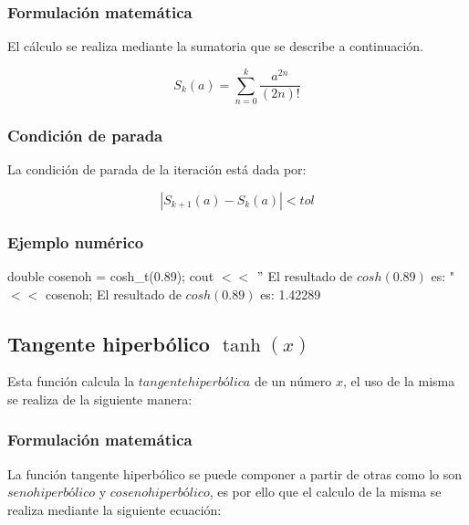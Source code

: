 \documentclass[10pt,a4paper]{article}
\begin{document}
	\subsubsection{Formulación matemática}

	El cálculo se realiza mediante la sumatoria que se describe a continuación.

	\begin{equation}\label{key16}
		S_{k}(a) = \sum_{n=0}^{k}\frac{a^{2n}}{(2n)!}
	\end{equation}

	\subsubsection{Condición de parada}

	La condición de parada de la iteración está dada por: 

	\begin{equation}\label{key17}
		\left\lvert S_{k+1}(a) - S_{k}(a) \right\lvert < tol
	\end{equation}
	
	\subsubsection{Ejemplo numérico}
	
	double cosenoh = cosh{\_}t(0.89); \newline
	cout $<<$ $"$ El resultado de $cosh(0.89)$ es: " $<<$ cosenoh; \newline
	El resultado de $cosh(0.89)$ es: 1.42289\newline

	\subsection{Tangente hiperbólico $\tanh(x)$}
	
	Esta función calcula la $tangente hiperbólica$ de un número $x$, el uso de la misma se realiza de la siguiente manera:
	
	\begin{center}
	\end{center}
	
	\subsubsection{Formulación matemática}
	
	La función tangente hiperbólico se puede componer a partir de otras como lo son $seno hiperbólico$ y $coseno hiperbólico$, es por ello que el calculo de la misma se realiza mediante la siguiente ecuación:
	
\end{document}

